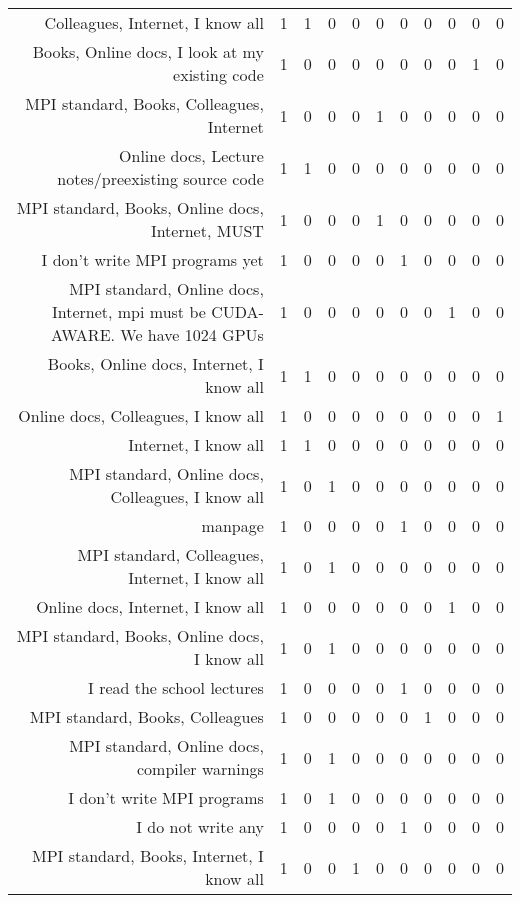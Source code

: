 {\begin{landscape}
\begin{longtable}[htb]{r|c|c|c|c|c|c|c|c|c|c}
{Colleagues, Internet, I know all} & 1 & 1 & 0 & 0 & 0 & 0 & 0 & 0 & 0 & 0 \\%
{Books, Online docs, I look at my existing code} & 1 & 0 & 0 & 0 & 0 & 0 & 0 & 0 & 1 & 0 \\%
{MPI standard, Books, Colleagues, Internet} & 1 & 0 & 0 & 0 & 1 & 0 & 0 & 0 & 0 & 0 \\%
{Online docs, Lecture notes/preexisting source code} & 1 & 1 & 0 & 0 & 0 & 0 & 0 & 0 & 0 & 0 \\%
{MPI standard, Books, Online docs, Internet, MUST} & 1 & 0 & 0 & 0 & 1 & 0 & 0 & 0 & 0 & 0 \\%
{I don't write MPI programs yet} & 1 & 0 & 0 & 0 & 0 & 1 & 0 & 0 & 0 & 0 \\%
{MPI standard, Online docs, Internet, mpi must be CUDA-AWARE. We have 1024 GPUs} & 1 & 0 & 0 & 0 & 0 & 0 & 0 & 1 & 0 & 0 \\%
{Books, Online docs, Internet, I know all} & 1 & 1 & 0 & 0 & 0 & 0 & 0 & 0 & 0 & 0 \\%
{Online docs, Colleagues, I know all} & 1 & 0 & 0 & 0 & 0 & 0 & 0 & 0 & 0 & 1 \\%
{Internet, I know all} & 1 & 1 & 0 & 0 & 0 & 0 & 0 & 0 & 0 & 0 \\%
{MPI standard, Online docs, Colleagues, I know all} & 1 & 0 & 1 & 0 & 0 & 0 & 0 & 0 & 0 & 0 \\%
{manpage} & 1 & 0 & 0 & 0 & 0 & 1 & 0 & 0 & 0 & 0 \\%
{MPI standard, Colleagues, Internet, I know all} & 1 & 0 & 1 & 0 & 0 & 0 & 0 & 0 & 0 & 0 \\%
{Online docs, Internet, I know all} & 1 & 0 & 0 & 0 & 0 & 0 & 0 & 1 & 0 & 0 \\%
{MPI standard, Books, Online docs, I know all} & 1 & 0 & 1 & 0 & 0 & 0 & 0 & 0 & 0 & 0 \\%
{I read the school lectures} & 1 & 0 & 0 & 0 & 0 & 1 & 0 & 0 & 0 & 0 \\%
{MPI standard, Books, Colleagues} & 1 & 0 & 0 & 0 & 0 & 0 & 1 & 0 & 0 & 0 \\%
{MPI standard, Online docs, compiler warnings} & 1 & 0 & 1 & 0 & 0 & 0 & 0 & 0 & 0 & 0 \\%
{I don't write MPI programs} & 1 & 0 & 1 & 0 & 0 & 0 & 0 & 0 & 0 & 0 \\%
{I do not write any} & 1 & 0 & 0 & 0 & 0 & 1 & 0 & 0 & 0 & 0 \\%
{MPI standard, Books, Internet, I know all} & 1 & 0 & 0 & 1 & 0 & 0 & 0 & 0 & 0 & 0 \\%
\hline%
\end{longtable}%
\end{landscape}}%
\clearpage%

